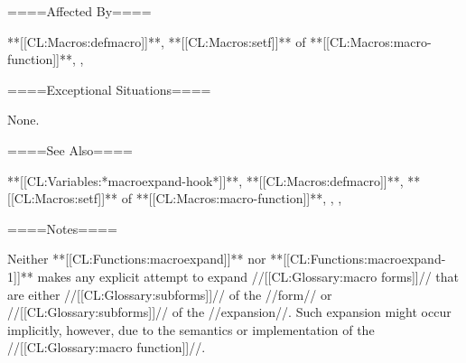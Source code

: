 ====Affected By====

**[[CL:Macros:defmacro]]**, **[[CL:Macros:setf]]** of **[[CL:Macros:macro-function]]**, , 

====Exceptional Situations====

None.

====See Also====

**[[CL:Variables:*macroexpand-hook*]]**, **[[CL:Macros:defmacro]]**, **[[CL:Macros:setf]]** of **[[CL:Macros:macro-function]]**, , , {\secref\Evaluation}

====Notes====

Neither **[[CL:Functions:macroexpand]]** nor **[[CL:Functions:macroexpand-1]]** makes any explicit attempt to expand //[[CL:Glossary:macro forms]]// that are either //[[CL:Glossary:subforms]]// of the //form// or //[[CL:Glossary:subforms]]// of the //expansion//. Such expansion might occur implicitly, however, due to the semantics or implementation of the //[[CL:Glossary:macro function]]//.

  
